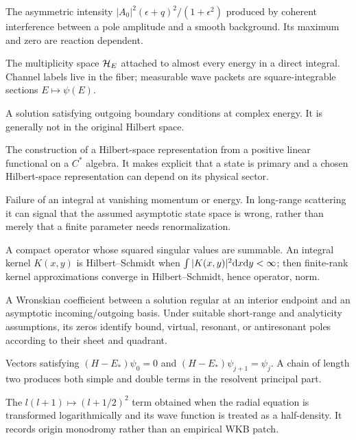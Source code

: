 \begin{description}[style=nextline]
  \item[Fano profile.]
  The asymmetric intensity $|A_0|^2(\epsilon+q)^2/(1+\epsilon^2)$ produced
  by coherent interference between a pole amplitude and a smooth
  background.  Its maximum and zero are reaction dependent.

  \item[Fiber Hilbert space.]
  The multiplicity space $\mathcal{H}_E$ attached to almost every energy in a direct
  integral.  Channel labels live in the fiber; measurable wave packets are
  square-integrable sections $E\mapsto\psi(E)$.

  \item[Gamow--Siegert state.] A solution satisfying outgoing boundary
  conditions at complex energy.  It is generally not in the original
  Hilbert space.

  \item[Gelfand--Naimark--Segal construction (GNS).]
  The construction of a Hilbert-space representation from a positive linear
  functional on a $C^*$ algebra.  It makes explicit that a state is primary
  and a chosen Hilbert-space representation can depend on its physical
  sector.

  \item[Infrared divergence.]
  Failure of an integral at vanishing momentum or energy.  In long-range
  scattering it can signal that the assumed asymptotic state space is wrong,
  rather than merely that a finite parameter needs renormalization.

  \item[Hilbert--Schmidt operator.]
  A compact operator whose squared singular values are summable.  An
  integral kernel $K(x,y)$ is Hilbert--Schmidt when
  $\int|K(x,y)|^2\mathrm{d} x\mathrm{d} y<\infty$; then finite-rank kernel
  approximations converge in Hilbert--Schmidt, hence operator, norm.

  \item[Jost function.]
  A Wronskian coefficient between a solution regular at an interior endpoint
  and an asymptotic incoming/outgoing basis.  Under suitable short-range and
  analyticity assumptions, its zeros identify bound, virtual, resonant, or
  antiresonant poles according to their sheet and quadrant.

  \item[Jordan chain.]
  Vectors satisfying $(H-E_*)\psi_0=0$ and
  $(H-E_*)\psi_{j+1}=\psi_j$.  A chain of length two produces both simple and
  double terms in the resolvent principal part.

  \item[Langer correction.]
  The $l(l+1)\mapsto(l+1/2)^2$ term obtained when the radial equation is
  transformed logarithmically and its wave function is treated as a
  half-density.  It records origin monodromy rather than an empirical WKB
  patch.


\end{description}
